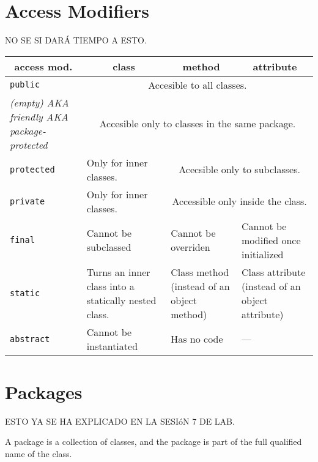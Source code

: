\documentclass[a4paper, 9pt]{extarticle}
\begin{document}
\section{Access Modifiers}

NO SE SI DARÁ TIEMPO A ESTO.

\begin{center}
  \begin{tabular}{|p{3cm}|p{4cm}|p{4cm}|p{4cm}|}
\hline
\multicolumn{1}{|c|}{access mod.} & \multicolumn{1}{|c|}{class} & \multicolumn{1}{|c|}{method} & \multicolumn{1}{|c|}{attribute} \\
\hline
\texttt{public}    & \multicolumn{3}{|c|}{Accesible to all classes.} \\
\hline
\textsl{(empty) AKA friendly AKA package-protected} & \multicolumn{3}{|c|}{Accesible only to classes in the same package.} \\
\hline
\texttt{protected}   & Only for inner classes. & \multicolumn{2}{|c|}{Acecsible only to subclasses.} \\
\hline
\texttt{private}     & Only for inner classes. & \multicolumn{2}{|c|}{Accessible only inside the class.} \\
\hline
\hline
\texttt{final}       & Cannot be subclassed & Cannot be overriden & Cannot be modified once initialized \\
\hline
\texttt{static}      & Turns an inner class into a statically nested class. & Class method (instead of an object method) & Class attribute (instead of an object attribute) \\
\hline
\texttt{abstract}    & Cannot be instantiated & Has no code & --- \\
\hline
\end{tabular}
\end{center}
















\section{Packages}

ESTO YA SE HA EXPLICADO EN LA SESIóN 7 DE LAB.

A package is a collection of classes, and the package is part of the full
qualified name of the class.
\end{document}
